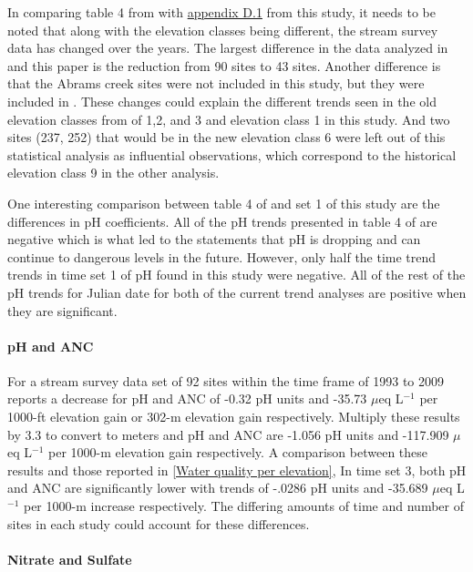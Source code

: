 In comparing table 4 from \citet{robinson2008ph} with \hyperref[app:Step-wise Julian date]{appendix D.1} from this study, it needs to be noted that along with the elevation classes being different, the stream survey data has changed over the years. 
The largest difference in the data analyzed in \citet{robinson2008ph} and this paper is the reduction from 90 sites to 43 sites. 
Another difference is that the Abrams creek sites were not included in this study, but they were included in \citet{robinson2008ph}. 
These changes could explain the different trends seen in the old elevation classes from \citet{robinson2008ph} of 1,2, and 3 and elevation class 1 in this study. 
And two sites (237, 252) that would be in the new elevation class 6 were left out of this statistical analysis as influential observations, which correspond to the historical elevation class 9 in the other analysis. 

One interesting comparison between table 4 of \citet{robinson2008ph} and set 1 of this study are the differences in pH coefficients. 
All of the pH trends presented in table 4 of \citet{robinson2008ph} are negative which is what led to the statements that pH is dropping and can continue to dangerous levels in the future. 
However, only half the time trend trends in time set 1 of pH found in this study were negative. 
All of the rest of the pH trends for Julian date for both of the current trend analyses are positive when they are significant.

\paragraph{pH and ANC}

For a stream survey data set of 92 sites within the time frame of 1993 to 2009 \citet{cai2013} reports a decrease for pH and ANC of -0.32 pH units and -35.73 $\mu$eq L$^{-1}$ per 1000-ft elevation gain or 302-m elevation gain respectively. 
Multiply these results by 3.3 to convert to meters and pH and ANC are -1.056 pH units and -117.909 $\mu$eq L$^{-1}$ per 1000-m elevation gain respectively.
A comparison between these results and those reported in \autoref{Water quality per elevation},
In time set 3,  both pH and ANC are significantly lower with trends of -.0286 pH units and -35.689 $\mu$eq L$^{-1}$  per 1000-m increase respectively.  
The differing amounts of time and number of sites in each study could account for these differences.

\paragraph{Nitrate and Sulfate}

